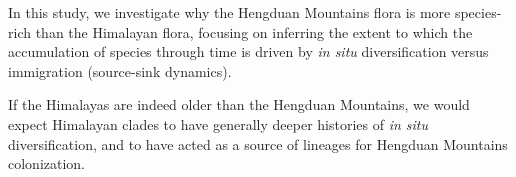 


In this study, we investigate why the Hengduan Mountains flora is more species-rich than the Himalayan flora, focusing on inferring the extent to which the accumulation of species through time is driven by \textit{in situ} diversification versus immigration (source-sink dynamics).

If the Himalayas are indeed older than the Hengduan Mountains, we would expect Himalayan clades to have generally deeper histories of \textit{in situ} diversification, and to have acted as a source of lineages for Hengduan Mountains colonization.


